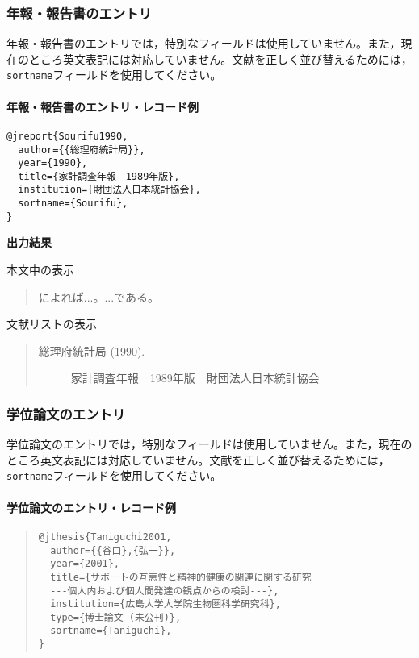 \documentclass[12pt]{ltjsarticle}
\begin{document}
\subsubsection{年報・報告書のエントリ}

年報・報告書のエントリでは，特別なフィールドは使用していません。また，現在のところ英文表記には対応していません。文献を正しく並び替えるためには，\texttt{sortname}フィールドを使用してください。

\paragraph{年報・報告書のエントリ・レコード例}
\begin{verbatim}
@jreport{Sourifu1990,
  author={{総理府統計局}},
  year={1990},
  title={家計調査年報　1989年版},
  institution={財団法人日本統計協会},
  sortname={Sourifu},
}
\end{verbatim}

\textbf{出力結果}

本文中の表示
\begin{quote}
\textcite{Sourifu1990}によれば...。...である\parencite{Sourifu1990}。
\end{quote}

文献リストの表示

\begin{quote}
\begin{description}
  \item[\textrm{総理府統計局 (1990).}]家計調査年報　1989年版　財団法人日本統計協会
\end{description}
\end{quote}

\subsubsection{学位論文のエントリ}

学位論文のエントリでは，特別なフィールドは使用していません。また，現在のところ英文表記には対応していません。文献を正しく並び替えるためには，\texttt{sortname}フィールドを使用してください。

\paragraph{学位論文のエントリ・レコード例}

\begin{quote}
\begin{verbatim}
@jthesis{Taniguchi2001,
  author={{谷口},{弘一}},
  year={2001},
  title={サポートの互恵性と精神的健康の関連に関する研究 
  ---個人内および個人間発達の観点からの検討---},
  institution={広島大学大学院生物圏科学研究科},
  type={博士論文 (未公刊)},
  sortname={Taniguchi},
}
\end{verbatim}
\end{quote}
\end{document}
